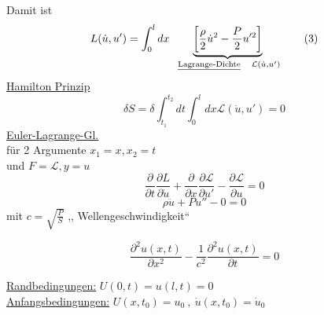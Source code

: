 \documentclass[titlepage,12pt,a4paper,ngerman]{report}
\newcommand{\tx}[1]{\textrm{#1}}
\newcommand{\ub}[1]{\underbrace{#1}}
\newcommand{\frbox}[2]{\begin{tcolorbox}[colback=white,colframe=red!75!black,fonttitle=\bfseries,title=#1]#2\end{tcolorbox}} %
\begin{document}
{Damit ist
\begin{equation*}
L(\dot{u},u') = \int_{0}^{l} dx \ \ub{\bigg[ \frac{\rho}{2} \dot{u}^2 - \frac{P}{2} u'^2\bigg]}_{\tx{ \underline{Lagrange-Dichte}} \quad \mathcal{L} (\dot{u},u') } \tag{3}
\end{equation*}
\underline{Hamilton Prinzip}
$$ \delta S = \delta \int_{t_1}^{t_2} dt \int_{0}^{l} dx \mathcal{L} (\dot{u},u') = 0$$
\underline{Euler-Lagrange-Gl.}\\
für 2 Argumente $ x_1 = x, x_2 = t $\\
und $ F = \mathcal{L}, y = u $
$$\frac{\partial}{\partial t} \frac{\partial L}{\partial \dot{u}} + \frac{\partial}{\partial x} \frac{\partial \mathcal{L}}{\partial u'} - \frac{\partial \mathcal{L}}{\partial u} = 0 $$
$$ \rho \ddot{u} + P u'' - 0 = 0 $$
mit $ c = \sqrt{\frac{P}{S}} $ ,, Wellengeschwindigkeit``\\
\frbox{Wellengleichung}{$$\frac{\partial^2 u(x,t)}{\partial x^2} - \frac{1}{c^2} \frac{\partial^2 u(x,t)}{\partial t} = 0 $$}
\noindent
\underline{Randbedingungen:} $  U(0,t) = u(l,t) = 0 $\\
\underline{Anfangsbedingungen:} $ U(x,t_0) = u_0\ , \ \dot{u}(x,t_0) = \dot{u}_0 $\\
}
\end{document}
